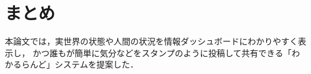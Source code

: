 \section{まとめ}
本論文では，実世界の状態や人間の状況を情報ダッシュボードにわかりやすく表示し，
かつ誰もが簡単に気分などをスタンプのように投稿して共有できる「わかるらんど」システムを提案した．

